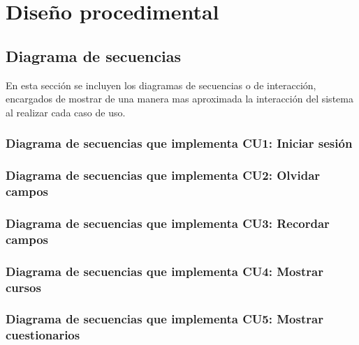 
\section{Diseño procedimental}

\subsection{Diagrama de secuencias}

En esta sección se incluyen los diagramas de secuencias o de interacción, encargados de mostrar de una manera mas aproximada la interacción del sistema al realizar cada caso de uso.

\subsubsection{Diagrama de secuencias que implementa CU1: Iniciar sesión}


\subsubsection{Diagrama de secuencias que implementa CU2: Olvidar campos}


\subsubsection{Diagrama de secuencias que implementa CU3: Recordar campos}

\subsubsection{Diagrama de secuencias que implementa CU4: Mostrar cursos}

\subsubsection{Diagrama de secuencias que implementa CU5: Mostrar cuestionarios}



